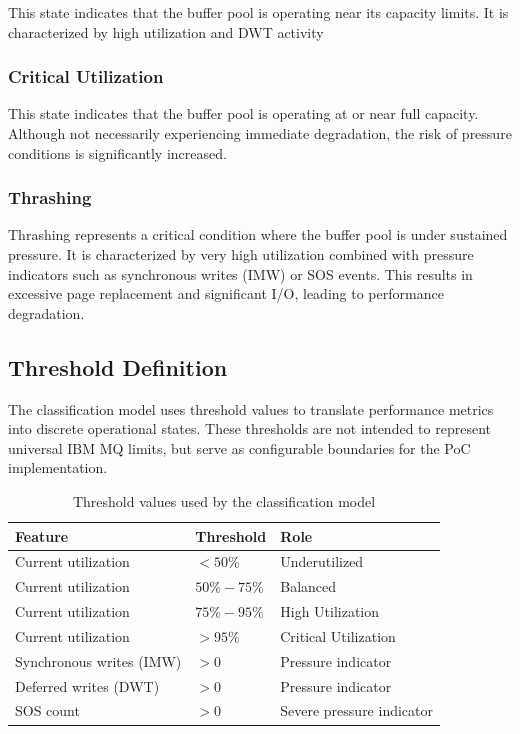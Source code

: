 This state indicates that the buffer pool is operating near its capacity limits. 
It is characterized by high utilization and DWT activity

\subsubsection{Critical Utilization}
This state indicates that the buffer pool is operating at or near full capacity. 
Although not necessarily experiencing immediate degradation, the risk 
of pressure conditions is significantly increased.

\subsubsection{Thrashing}
Thrashing represents a critical condition where the buffer pool is under sustained 
pressure. It is characterized by very high utilization combined with pressure 
indicators such as synchronous writes (IMW) or SOS events. This results in excessive 
page replacement and significant I/O, leading to performance degradation.

\subsection{Threshold Definition}

The classification model uses threshold values to translate performance metrics into discrete operational states. These thresholds are not intended to represent universal IBM MQ limits, but serve as configurable boundaries for the PoC implementation.

\begin{table}[h]
    \centering
    \begin{tabular}{|l|l|l|}
        \hline
        \textbf{Feature} & \textbf{Threshold} & \textbf{Role} \\
        \hline
        Current utilization & $< 50\%$ & Underutilized \\
        \hline
        Current utilization & $50\%-75\%$ & Balanced \\
        \hline
        Current utilization & $75\%-95\%$ & High Utilization \\
        \hline
        Current utilization & $> 95\%$ & Critical Utilization \\
        \hline
        Synchronous writes (IMW) & $> 0$ & Pressure indicator \\
        \hline
        Deferred writes (DWT) & $> 0$ & Pressure indicator \\
        \hline
        SOS count & $> 0$ & Severe pressure indicator \\
        \hline
    \end{tabular}
    \caption{Threshold values used by the classification model}
\end{table}


